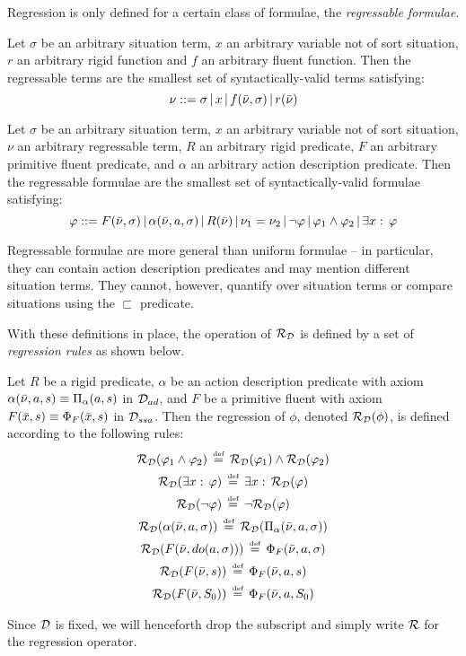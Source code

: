 Regression is only defined for a certain class of formulae, the \emph{regressable
formulae}.

\begin{defnL}
 Let $\sigma$ be an arbitrary situation
term, $x$ an arbitrary variable not of sort situation, $r$ an arbitrary
rigid function and $f$ an arbitrary fluent function. Then the regressable
terms are the smallest set of syntactically-valid terms satisfying:
\[
\nu::=\sigma\,|\, x\,|\, f(\bar{\nu},\sigma)\,|\, r(\bar{\nu})\]

\begin{defnL}
 Let $\sigma$ be an arbitrary situation
term, $x$ an arbitrary variable not of sort situation, $\nu$ an
arbitrary regressable term, $R$ an arbitrary rigid predicate, $F$
an arbitrary primitive fluent predicate, and $\alpha$ an arbitrary
action description predicate. Then the regressable formulae are the
smallest set of syntactically-valid formulae satisfying: \[
\varphi::=F(\bar{\nu},\sigma)\,|\,\alpha(\bar{\nu},a,\sigma)\,|\, R(\bar{\nu})\,|\,\nu_{1}=\nu_{2}\,|\,\neg\varphi\,|\,\varphi_{1}\wedge\varphi_{2}\,|\,\exists x:\,\varphi\]

\end{defnL}
\end{defnL}
Regressable formulae are more general than uniform formulae -- in
particular, they can contain action description predicates and may
mention different situation terms. They cannot, however, quantify
over situation terms or compare situations using the $\sqsubset$
predicate.

With these definitions in place, the operation of $\mathcal{R}_{\mathcal{D}}$ is
defined by a set of \emph{regression rules} as shown below.

\begin{defnL}
 Let $R$ be a rigid predicate, $\alpha$
be an action description predicate with axiom $\alpha(\bar{\nu},a,s)\equiv\Pi_{\alpha}(a,s)$
in $\mathcal{D}_{ad}$, and $F$ be a primitive fluent with axiom $F(\bar{x},s)\equiv\Phi_{F}(\bar{x},s)$
in $\mathcal{D}_{ssa}$. Then the regression of $\phi$, denoted $\mathcal{R}_{\mathcal{D}}(\phi)$,
is defined according to the following rules:\begin{gather*}
\mathcal{R}_{\mathcal{D}}(\varphi_{1}\wedge\varphi_{2})\,\stackrel{\mbox{\tiny def}}{=}\,\mathcal{R}_{\mathcal{D}}(\varphi_{1})\wedge\mathcal{R}_{\mathcal{D}}(\varphi_{2})\\
\mathcal{R}_{\mathcal{D}}(\exists x:\,\varphi)\,\stackrel{\mbox{\tiny def}}{=}\,\exists x:\,\mathcal{R}_{\mathcal{D}}(\varphi)\\
\mathcal{R}_{\mathcal{D}}(\neg\varphi)\,\stackrel{\mbox{\tiny def}}{=}\,\neg\mathcal{R}_{\mathcal{D}}(\varphi)\\
\mathcal{R}_{\mathcal{D}}(\alpha(\bar{\nu},a,\sigma))\,\stackrel{\mbox{\tiny def}}{=}\,\mathcal{R}_{\mathcal{D}}(\Pi_{\alpha}(\bar{\nu},a,\sigma))\\
\mathcal{R}_{\mathcal{D}}(F(\bar{\nu},do(a,\sigma)))\,\stackrel{\mbox{\tiny def}}{=}\,\Phi_{F}(\bar{\nu},a,\sigma)\\
\mathcal{R}_{\mathcal{D}}(F(\bar{\nu},s))\,\stackrel{\mbox{\tiny def}}{=}\,\Phi_{F}(\bar{\nu},a,s)\\
\mathcal{R}_{\mathcal{D}}(F(\bar{\nu},S_{0}))\,\stackrel{\mbox{\tiny def}}{=}\,\Phi_{F}(\bar{\nu},a,S_{0})\end{gather*}

\end{defnL}
Since $\mathcal{D}$ is fixed, we will henceforth drop the subscript and simply
write $\mathcal{R}$ for the regression operator.

